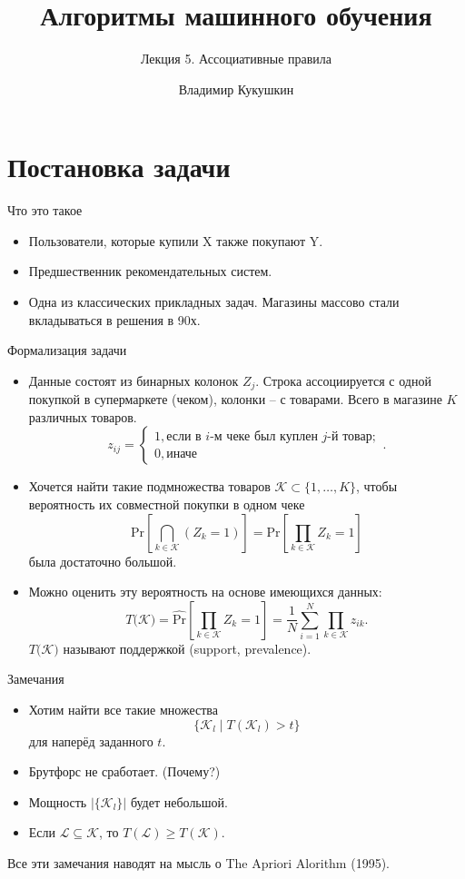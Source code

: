 \documentclass[9pt]{beamer}
\title{Алгоритмы машинного обучения}
\subtitle{Лекция 5. Ассоциативные правила}
\author{Владимир Кукушкин}
\institute{СПбГЭУ - 16.12.2020}
\begin{document}
\titlepage

\section{Постановка задачи}

\begin{frame}{Что это такое}
\begin{itemize}
    \item Пользователи, которые купили X также покупают Y.
    \item Предшественник рекомендательных систем. 
    \item Одна из классических прикладных задач. Магазины массово стали вкладываться в решения в 90х.
\end{itemize}
\end{frame}

\begin{frame}{Формализация задачи}
\begin{itemize}
    \item Данные состоят из бинарных колонок $Z_j$. Строка ассоциируется с одной покупкой в супермаркете (чеком), колонки -- с товарами. Всего в магазине $K$ различных товаров.
    $$z_{ij} = \begin{cases}
    1, \text{если в $i$-м чеке был куплен $j$-й товар};\\
    0, \text{иначе}
    \end{cases}.$$
    \item Хочется найти такие подмножества товаров $\mathcal{K}\subset \{1, \ldots, K\}$, чтобы вероятность их совместной покупки в одном чеке
    $$\text{Pr}\left[\underset{k\in \mathcal{K}}{\bigcap} (Z_k = 1)\right] = \text{Pr}\left[\underset{k\in \mathcal{K}}{\prod} Z_k = 1\right]$$
    была достаточно большой.
    \item Можно оценить эту вероятность на основе имеющихся данных:
    $$T(\mathcal{K)} = \widehat{\text{Pr}}\left[\underset{k\in \mathcal{K}}{\prod} Z_k = 1\right] = \frac{1}{N}\sum_{i=1}^N \underset{k\in \mathcal{K}}{\prod} z_{ik}.$$
    $T(\mathcal{K)}$ называют поддержкой (support, prevalence).
\end{itemize}
\end{frame}

\begin{frame}{Замечания}
\begin{itemize}
    \item Хотим найти все такие множества
    \begin{equation}\label{ass_rule_main}\{\mathcal{K}_l\;|\;T(\mathcal{K}_l) > t\}\end{equation}
    для наперёд заданного $t$.
    \item Брутфорс не сработает. (Почему?)
    \item Мощность $|\{\mathcal{K}_l\}|$ будет небольшой.
    \item Если $\mathcal{L} \subseteq \mathcal{K}$, то $T(\mathcal{L}) \geq T(\mathcal{K})$.
\end{itemize}
Все эти замечания наводят на мысль о The Apriori Alorithm (1995).
\end{frame}
\end{document}
